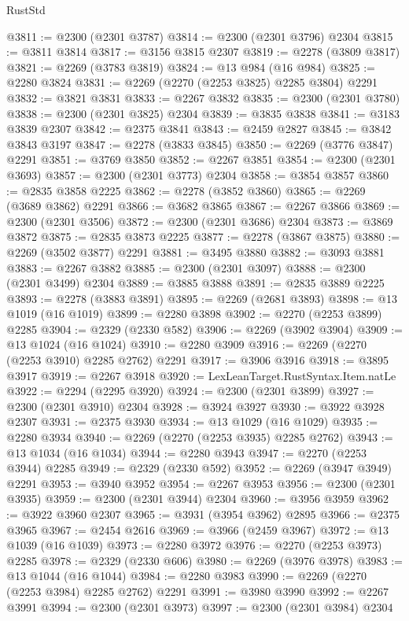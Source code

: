 \begin{lexlean}{RustStd}
\begin{coremodule}
@3811 := @2300 (@2301 @3787)
@3814 := @2300 (@2301 @3796) @2304
@3815 := @3811 @3814
@3817 := @3156 @3815 @2307
@3819 := @2278 (@3809 @3817)
@3821 := @2269 (@3783 @3819)
@3824 := @13 @984 (@16 @984)
@3825 := @2280 @3824
@3831 := @2269 (@2270 (@2253 @3825) @2285 @3804) @2291
@3832 := @3821 @3831
@3833 := @2267 @3832
@3835 := @2300 (@2301 @3780)
@3838 := @2300 (@2301 @3825) @2304
@3839 := @3835 @3838
@3841 := @3183 @3839 @2307
@3842 := @2375 @3841
@3843 := @2459 @2827
@3845 := @3842 @3843 @3197
@3847 := @2278 (@3833 @3845)
@3850 := @2269 (@3776 @3847) @2291
@3851 := @3769 @3850
@3852 := @2267 @3851
@3854 := @2300 (@2301 @3693)
@3857 := @2300 (@2301 @3773) @2304
@3858 := @3854 @3857
@3860 := @2835 @3858 @2225
@3862 := @2278 (@3852 @3860)
@3865 := @2269 (@3689 @3862) @2291
@3866 := @3682 @3865
@3867 := @2267 @3866
@3869 := @2300 (@2301 @3506)
@3872 := @2300 (@2301 @3686) @2304
@3873 := @3869 @3872
@3875 := @2835 @3873 @2225
@3877 := @2278 (@3867 @3875)
@3880 := @2269 (@3502 @3877) @2291
@3881 := @3495 @3880
@3882 := @3093 @3881
@3883 := @2267 @3882
@3885 := @2300 (@2301 @3097)
@3888 := @2300 (@2301 @3499) @2304
@3889 := @3885 @3888
@3891 := @2835 @3889 @2225
@3893 := @2278 (@3883 @3891)
@3895 := @2269 (@2681 @3893)
@3898 := @13 @1019 (@16 @1019)
@3899 := @2280 @3898
@3902 := @2270 (@2253 @3899) @2285
@3904 := @2329 (@2330 @582)
@3906 := @2269 (@3902 @3904)
@3909 := @13 @1024 (@16 @1024)
@3910 := @2280 @3909
@3916 := @2269 (@2270 (@2253 @3910) @2285 @2762) @2291
@3917 := @3906 @3916
@3918 := @3895 @3917
@3919 := @2267 @3918
@3920 := LexLeanTarget.RustSyntax.Item.natLe
@3922 := @2294 (@2295 @3920)
@3924 := @2300 (@2301 @3899)
@3927 := @2300 (@2301 @3910) @2304
@3928 := @3924 @3927
@3930 := @3922 @3928 @2307
@3931 := @2375 @3930
@3934 := @13 @1029 (@16 @1029)
@3935 := @2280 @3934
@3940 := @2269 (@2270 (@2253 @3935) @2285 @2762)
@3943 := @13 @1034 (@16 @1034)
@3944 := @2280 @3943
@3947 := @2270 (@2253 @3944) @2285
@3949 := @2329 (@2330 @592)
@3952 := @2269 (@3947 @3949) @2291
@3953 := @3940 @3952
@3954 := @2267 @3953
@3956 := @2300 (@2301 @3935)
@3959 := @2300 (@2301 @3944) @2304
@3960 := @3956 @3959
@3962 := @3922 @3960 @2307
@3965 := @3931 (@3954 @3962) @2895
@3966 := @2375 @3965
@3967 := @2454 @2616
@3969 := @3966 (@2459 @3967)
@3972 := @13 @1039 (@16 @1039)
@3973 := @2280 @3972
@3976 := @2270 (@2253 @3973) @2285
@3978 := @2329 (@2330 @606)
@3980 := @2269 (@3976 @3978)
@3983 := @13 @1044 (@16 @1044)
@3984 := @2280 @3983
@3990 := @2269 (@2270 (@2253 @3984) @2285 @2762) @2291
@3991 := @3980 @3990
@3992 := @2267 @3991
@3994 := @2300 (@2301 @3973)
@3997 := @2300 (@2301 @3984) @2304

\end{coremodule}
\end{lexlean}
